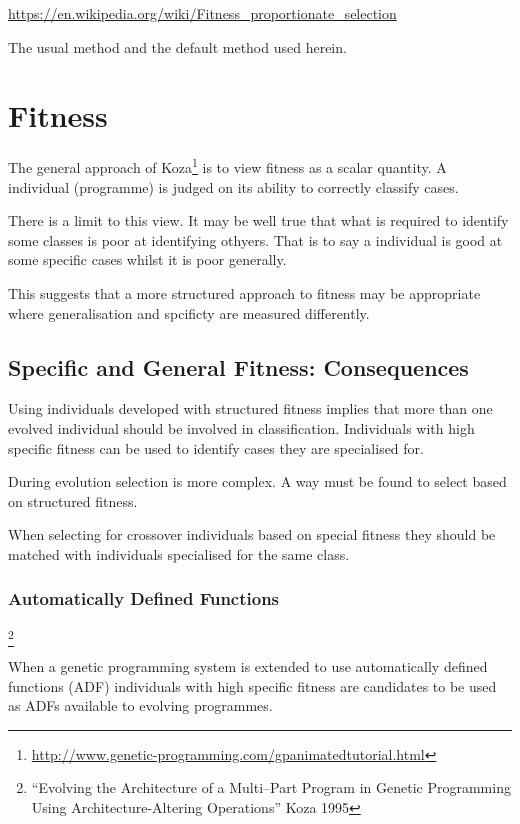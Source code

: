 \documentclass[a4paper,twoside]{article}
\begin{document}
\url{https://en.wikipedia.org/wiki/Fitness_proportionate_selection}

The usual method and the default method used herein.

\section{Fitness}

The general approach of
Koza\footnote{\url{http://www.genetic-programming.com/gpanimatedtutorial.html}}
is to view fitness as a scalar quantity.  A individual (programme) is
judged on its ability to correctly classify cases.

There is a limit to this view.  It may be well true that what is
required to identify some classes is poor at identifying othyers.
That is to say a individual is good at some specific cases whilst it
is poor generally.

This suggests that a more structured approach to fitness may be
appropriate where generalisation and spcificty are measured
differently.

\subsection{Specific and General Fitness: Consequences}

Using individuals developed with structured fitness implies that more
than one evolved individual should be involved in classification.
Individuals with high specific fitness can be used to identify cases
they are specialised for.

During evolution selection is more complex.  A way must be found to
select based on structured fitness.

When selecting for crossover individuals based on special fitness they
should be matched with individuals specialised for the same class.

\subsubsection{Automatically Defined Functions}\footnote{``Evolving
  the Architecture of a Multi--Part Program in Genetic Programming
  Using Architecture-Altering Operations'' Koza 1995}

When a genetic programming system is extended to use automatically
defined functions (ADF) individuals with high specific fitness are
candidates to be used as ADFs available to evolving programmes.


  
\end{document}
